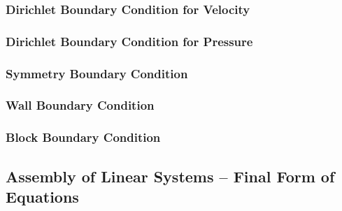       \subsubsection{Dirichlet Boundary Condition for Velocity}

      \subsubsection{Dirichlet Boundary Condition for Pressure}

      \subsubsection{Symmetry Boundary Condition}

      \subsubsection{Wall Boundary Condition}

      \subsubsection{Block Boundary Condition}

    \subsection{Assembly of Linear Systems -- Final Form of Equations}

